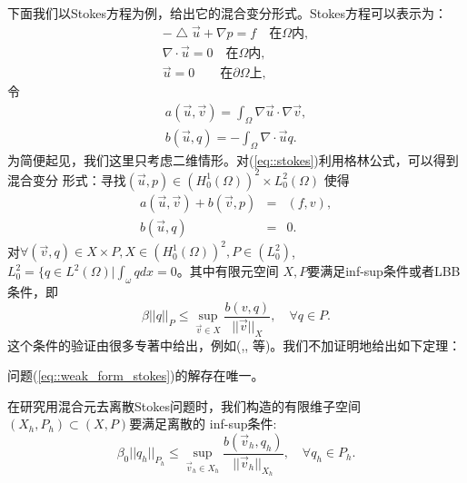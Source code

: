     下面我们以Stokes方程为例，给出它的混合变分形式。Stokes方程可以表示为：
    \begin{equation}
        \begin{aligned}
            -\bigtriangleup \vec{u} + \nabla p = f \quad \text{在}\Omega \text{内}, \\
            \nabla \cdot \vec{u} = 0 \quad \text{在}\Omega \text{内},\\
            \vec{u} = 0 \qquad \text{在}\partial \Omega \text{上},
        \end{aligned}
        \label{eq::stokes}
    \end{equation}
    令
    \begin{eqnarray}
        a(\vec{u},\vec{v}) = \int_{\Omega} \nabla \vec{u} \cdot \nabla \vec{v},  \\
        b(\vec{u}, q) = -\int_{\Omega} \nabla \cdot \vec{u} q.
    \end{eqnarray}
    为简便起见，我们这里只考虑二维情形。对(\ref{eq::stokes})利用格林公式，可以得到混合变分
    形式：寻找$(\vec{u}, p) \in (H_0^1(\Omega))^2 \times L_0^2(\Omega)$ 使得
    \begin{equation}
        \begin{aligned}
            a(\vec{u}, \vec{v}) + b(\vec{v}, p) &=& (f,v), \\
            b(\vec{u},q) &=& 0.
        \end{aligned}
        \label{eq::weak_form_stokes}
    \end{equation}
    对$\forall (\vec{v}, q) \in X \times P, X \in (H_0^1(\Omega))^2, P \in
    (L_0^2)$, $L_0^2 = \{q \in L^2(\Omega)| \int_{\omega}q dx = 0$。其中有限元空间
    $X,P$要满足inf-sup条件或者LBB条件，即
    \begin{equation}
        \beta ||q||_{P} \leq \sup\limits_{\vec{v} \in X}\frac{b(v, q)}{||\vec{v}||_X},
        \quad \forall q \in P.
        \label{eq::LBB_cond}
    \end{equation}
    这个条件的验证由很多专著中给出，例如(\cite{brezzi2012mixed},\cite{brenner2007mathematical},
    \cite{cuvelier1986finite}等)。我们不加证明地给出如下定理：
    \begin{theorem}
        问题(\ref{eq::weak_form_stokes})的解存在唯一。
    \end{theorem}
    在研究用混合元去离散Stokes问题时，我们构造的有限维子空间$(X_h, P_h) \subset (X, P)$要满足离散的
    inf-sup条件:
    \begin{equation}
        \beta_0||q_h||_{P_h} \leq \sup\limits_{\vec{v}_h \in X_h}\frac{b(\vec{v}_h, q_h)}{||\vec{v}_h||_{X_h}},
        \quad \forall q_h \in P_h.
        \label{eq::discretized_LBB_cond}
    \end{equation}
